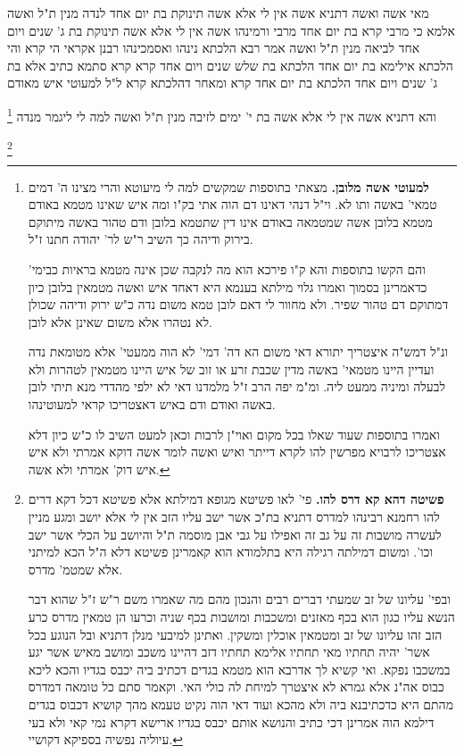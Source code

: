 \documentclass[12pt, openany]{book}
\newcommand{\footnotecomment}[1]{
	\renewcommand\thefootnote{}
	\footnote{#1}}
\newcommand{\commenta}[1]{\footnotecomment{#1}}
\begin{document}
{מאי אשה ואשה דתניא אשה אין לי אלא אשה תינוקת בת יום אחד לנדה מנין ת"ל ואשה 
אלמא כי מרבי קרא בת יום אחד מרבי ורמינהו אשה אין לי אלא אשה תינוקת בת ג' שנים ויום אחד לביאה מנין ת"ל ואשה 
אמר רבא הלכתא נינהו ואסמכינהו רבנן אקראי הי קרא והי הלכתא אילימא בת יום אחד הלכתא בת שלש שנים ויום אחד קרא קרא סתמא כתיב 
אלא בת ג' שנים ויום אחד הלכתא בת יום אחד קרא ומאחר דהלכתא קרא ל"ל
למעוטי איש מאודם 
\commenta{\textbf{למעוטי אשה מלובן.} מצאתי בתוספות שמקשים למה לי מיעוטא והרי מצינו ה' דמים טמאי' באשה ותו לא. וי"ל דנהי דאינו דם הוה אתי בק"ו ומה איש שאינו מטמא באודם מטמא בלובן אשה שמטמאה באודם אינו דין שתטמא בלובן ודם טהור באשה מיתוקם בירוק ודיהה כך השיב ר"ש לר' יהודה חתנו ז"ל.\par והם הקשו בתוספות והא ק"ו פירכא הוא מה לנקבה שכן אינה מטמא בראיות כבימי' כדאמרינן בסמוך ואמרו גלוי מילתא בענמא היא דאחד איש ואשה מטמאין בלובן כיון דמתוקם דם טהור שפיר. ולא מחוור לי דאם לובן טמא משום נדה כ"ש ירוק ודיהה שכולן לא נטהרו אלא משום שאינן אלא לובן.\par ונ"ל דמש"ה איצטריך יתורא דאי משום הא דה' דמי' לא הוה ממעטי' אלא מטומאת נדה ועדיין היינו מטמאי' באשה מדין שכבת זרע או זוב של איש היינו מטמאין לטהרות ולא לבעלה ומיניה ממעט ליה. ומ"מ יפה הרב ז"ל מלמדנו דאי לא ילפי מהדדי מנא תיתי לובן באשה ואודם ודם באיש דאצטריכו קראי למעוטינהו.\par ואמרו בתוספות שעוד שאלו בכל מקום ואוי"ן לרבות וכאן למעט השיב לו כ"ש כיון דלא אצטריכו לרבויא מפרשין להו לקרא דייתר ואיש ואשה לומר אשה דוקא אמרתי ולא איש איש דוק' אמרתי ולא אשה. }
והא דתניא אשה אין לי אלא אשה בת י' ימים לזיבה מנין ת"ל ואשה למה לי ליגמר מנדה 
\commenta{\textbf{פשיטה דהא קא דרס להו.} פי' לאו פשיטא מגופא דמילתא אלא פשיטא דכל דקא דרים להו רחמנא רבינהו למדרס דתניא בת"כ אשר ישב עליו הזב אין לי אלא יושב ומגע מניין לעשרה מושבות זה על גב זה ואפילו על גבי אבן מוסמה ת"ל והיושב על הכלי אשר ישב וכו'. ומשום דמילתה רגילה היא בתלמודא הוא קאמרינן פשיטא דלא ה"ל הכא למיתני אלא שמטמ' מדרס.\par ובפי' עליונו של זב שמעתי דברים רבים והנכון מהם מה שאמרו משם ר"ש ז"ל שהוא דבר הנשא עליו כגון הוא בכף מאזנים ומשכבות ומושבות בכף שניה וכרעו הן טמאין מדרס כרע הזב זהו עליונו של זב ומטמאין אוכלין ומשקין. ואתינן למיבעי מנלן דתניא ובל הנוגע בכל אשר' יהיה תחתיו מאי תחתיו אלימא תחתיו דזב דהיינו משכב ומושב מאיש אשר יגע במשכבו נפקא. ואי קשיא לך אדרבא הוא מטמא בגדים דכתיב ביה יכבס בגדיו והכא ליכא כבוס אה"נ אלא גמרא לא איצטרך למיחת לה כולי האי. וקאמר סתם כל טומאה דמדרס מהתם היא כדכתיבנא ביה ולא מהכא ועוד דאי הוה נקיט טעמא מהך קושיא דכבוס בגדים דילמא הוה אמרינן דכי כתיב והנושא אותם יכבס בגדיו ארישא דקרא נמי קאי ולא בעי עיוליה נפשיה בספיקא דקושיי. }
}
\end{document}
